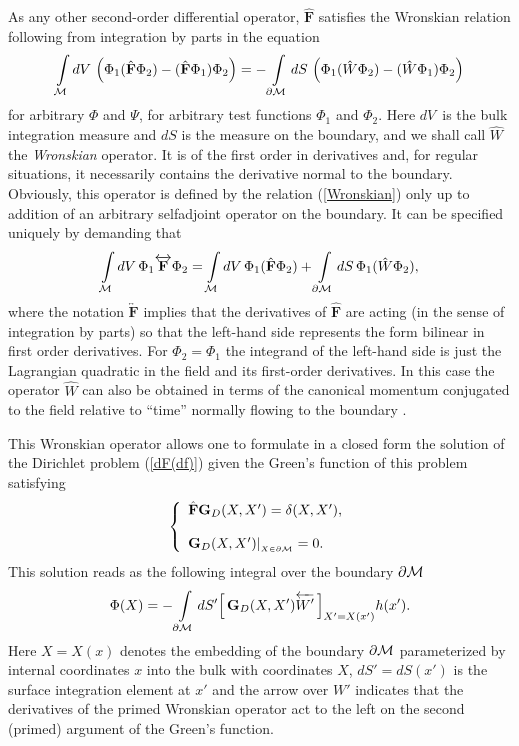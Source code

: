 \documentclass[a4paper,12pt]{article}
\newcommand{\M}{{\cal M}}
\newcommand{\dM}{{\partial \cal M}}
\newcommand{\BBox}{\hat{\mathbf{F}}}  %
\newcommand{\GrD}{ \mathbf{G}_{D}}  %
\newcommand{\dV}{dV\,}
\newcommand{\dS}{dS}
\begin{document}
As any other second-order differential operator, $\BBox$ satisfies
the Wronskian relation following from integration by parts in the
equation
    \begin{eqnarray}
     \int\limits_{\M} \dV
    \left(\Phi_1(\BBox \Phi_2)
    -(\BBox\Phi_1) \Phi_2\right)=
     -\int\limits_{\dM}\dS\,
    \left(\Phi_1 (\hat W\Phi_2)
    -(\hat W \Phi_1)\Phi_2\right)         \label{Wronskian}
    \end{eqnarray}
    for arbitrary $\Phi$ and $\Psi$,
for arbitrary test functions $\Phi_1$ and $\Phi_2$. Here
$\dV$ is the bulk integration measure and $\dS$ is the measure on the
boundary, and we shall call $\hat W$ the {\em  Wronskian} operator. It is
of the first order in derivatives and, for regular situations, it
necessarily contains the derivative normal to the boundary. Obviously,
this operator is defined by the relation
(\ref{Wronskian}) only up to addition of an arbitrary selfadjoint operator
on the boundary. It can be specified uniquely by demanding that
    \begin{eqnarray}
    \int\limits_{\M} \dV \Phi_1
    \overleftrightarrow{\mathbf F}\Phi_2  =
    \int\limits_{\M} \dV \Phi_1(\BBox \Phi_2)+
        \int\limits_{\dM}\dS\,
    \Phi_1(\hat W \Phi_2),        \label{Wronskian2}
    \end{eqnarray}
where the notation $\overleftrightarrow{\mathbf F}$ implies that
the derivatives of $\BBox$ are acting (in the sense of integration
by parts) so that the left-hand side represents the form bilinear
in first order derivatives. For $\Phi_2=\Phi_1$ the integrand of
the left-hand side is just the Lagrangian quadratic in the field
and its first-order derivatives. In this case the operator $\hat
W$ can also be obtained in terms of the canonical momentum
conjugated to the field relative to ``time'' normally flowing to
the boundary \cite{reduc}.

This Wronskian operator allows one to formulate in
a closed form the solution of the Dirichlet problem
(\ref{dF(df)}) given the Green's function of this problem
satisfying
    \begin{eqnarray}
     \left\{ \begin{array}{l}
     \BBox \GrD(X,X')=\delta(X,X'), \\
    \\
     \GrD(X,X')|_{_{X\in\dM}}=0.
     \end{array} \right.                   \label{DGfbvp}
    \end{eqnarray}
This solution reads as the following integral over the boundary
$\dM$
    \begin{eqnarray}
        \Phi(X)=-\int \limits_{\dM}\dS'
        \Big[\,\GrD(X,X')
    \overleftarrow{W'}\,\Big]_{X'=X(x')}
    h(x').                        \label{DGenSol}
    \end{eqnarray}
Here $X=X(x)$ denotes the embedding of the boundary $\dM$
parameterized by internal coordinates $x$ into the bulk with
coordinates $X$, $dS'=dS(x')$ is the surface integration element
at $x'$ and the arrow over $W'$ indicates that the derivatives of
the primed Wronskian operator act to the left on the second
(primed) argument of the Green's function.
\end{document}

